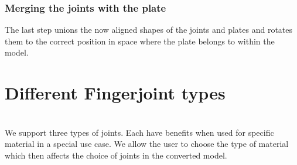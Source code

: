 \documentclass[../ClassicThesis.tex]{subfiles}
\begin{document}
\subsubsection{Merging the joints with the plate}
The last step unions the now aligned shapes of the joints and plates and rotates them to the correct position in space where the plate belongs to within the model.


\section{Different Fingerjoint types}

\\
We support three types of joints. Each have benefits when used for specific material in a special use case. We allow the user to choose the type of material which then affects the choice of joints in the converted model.
\end{document}
